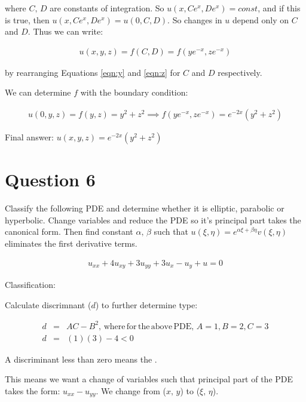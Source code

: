 \documentclass[a4paper,12pt]{article}
\begin{document}
where $C,\,D$ are constants of integration. So $u(x,Ce^x,De^x) = const$, and if this is true, then $u(x,Ce^x,De^x) = u(0,C,D)$. So changes in $u$ depend only on $C$ and $D$. Thus we can write:

\begin{eqnarray}
u(x,y,z) = f(C,D) = f(ye^{-x},ze^{-x})\nonumber
\end{eqnarray}

by rearranging Equations \ref{eqn:y} and \ref{eqn:z} for $C$ and $D$ respectively.

We can determine $f$ with the boundary condition:

\begin{eqnarray}
u(0,y,z) = f(y,z) = y^2+z^2\implies f(ye^{-x},ze^{-x}) = e^{-2x}(y^2 + z^2)\nonumber
\end{eqnarray}

Final answer: $\boxed{u(x,y,z) = e^{-2x}(y^2 + z^2)}$

\section{Question 6}

Classify the following PDE and determine whether it is elliptic, parabolic or hyperbolic. Change variables and reduce the PDE so it's principal part takes the canonical form. Then find constant $\alpha,\,\beta$ such that $u(\xi,\eta) = e^{\alpha\xi + \beta\eta}v(\xi,\eta)$ eliminates the first derivative terms.

\begin{eqnarray}
u_{xx} + 4u_{xy} + 3u_{yy} + 3u_x - u_y + u = 0 
\label{eqn:pde}
\end{eqnarray}

Classification: 

Calculate discrimnant ($d$) to further determine type:

\begin{eqnarray}
d &=& AC - B^2,\mathrm{\, where\, for\, the\, above\, PDE,\, } A = 1, B = 2, C = 3\nonumber\\
d &=& (1)(3) - 4 < 0\nonumber
\end{eqnarray}

A discriminant less than zero means the .

This means we want a change of variables such that principal part of the PDE takes the form: $u_{xx} - u_{yy}$. We change from ($x,\,y$) to ($\xi,\,\eta$).
\end{document}
